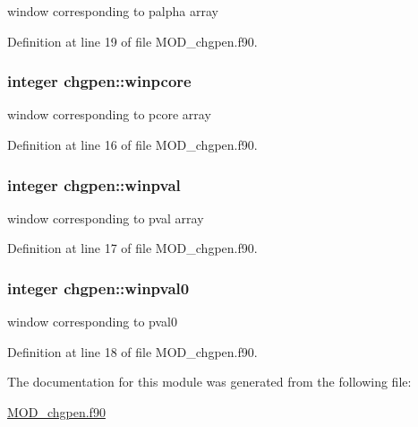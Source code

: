 window corresponding to palpha array 



Definition at line 19 of file M\-O\-D\-\_\-chgpen.\-f90.

\hypertarget{classchgpen_ad3b954d2def93e4386c239ee5fc9a588}{
\subsubsection[{winpcore}]{\setlength{\rightskip}{0pt plus 5cm}integer chgpen\-::winpcore}}\label{classchgpen_ad3b954d2def93e4386c239ee5fc9a588}


window corresponding to pcore array 



Definition at line 16 of file M\-O\-D\-\_\-chgpen.\-f90.

\hypertarget{classchgpen_a0c52f88ecb1d7385b90fc1a373d931db}{
\subsubsection[{winpval}]{\setlength{\rightskip}{0pt plus 5cm}integer chgpen\-::winpval}}\label{classchgpen_a0c52f88ecb1d7385b90fc1a373d931db}


window corresponding to pval array 



Definition at line 17 of file M\-O\-D\-\_\-chgpen.\-f90.

\hypertarget{classchgpen_a0868dc9de1a487fd55dfe7983cb04386}{
\subsubsection[{winpval0}]{\setlength{\rightskip}{0pt plus 5cm}integer chgpen\-::winpval0}}\label{classchgpen_a0868dc9de1a487fd55dfe7983cb04386}


window corresponding to pval0 



Definition at line 18 of file M\-O\-D\-\_\-chgpen.\-f90.



The documentation for this module was generated from the following file\-:\begin{DoxyCompactItemize}
\item 
\hyperlink{MOD__chgpen_8f90}{M\-O\-D\-\_\-chgpen.\-f90}\end{DoxyCompactItemize}
